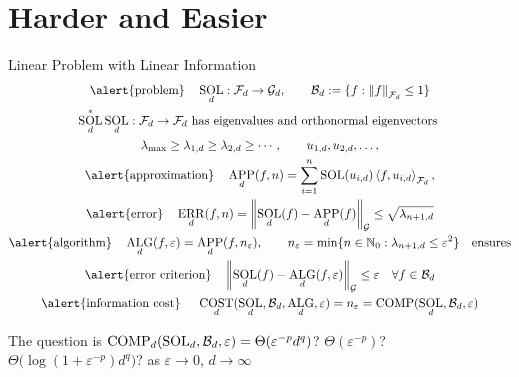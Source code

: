\documentclass[11pt,compress,xcolor={usenames,dvipsnames},aspectratio=169]{beamer}
\DeclareMathOperator{\COMP}{COMP}
\DeclareMathOperator{\COST}{COST}
\DeclareMathOperator{\ALG}{ALG}
\DeclareMathOperator{\SOL}{SOL}
\DeclareMathOperator{\APP}{APP}
\DeclareMathOperator{\ERR}{ERR}
\begin{document}
\section{Harder and Easier}
\begin{frame}{Linear Problem with Linear Information}
    \vspace{-6ex}
   \begin{gather*}
   \text{\alert{problem}}\quad \SOL_d : \cf_d \to \cg_d,  \qquad \cb_d : = \{f : \norm[\cf_d]{f} \le 1 \} \\
   \SOL_d^*\SOL_d : \cf_d \to \cf_d \text{ has eigenvalues and orthonormal eigenvectors } \\
\lambda_{\max} \ge \lambda_{1,d} \ge \lambda_{2,d} \ge \cdots, \qquad u_{1,d}, u_{2,d}, \ldots, \\
   \text{\alert{approximation}\quad} \APP_d(f,n) = \sum_{i=1}^n \SOL(u_{i,d}) \ip[\cf_d]{f}{u_{i,d}}, \\
   \text{\alert{error}\quad}\ERR_d(f,n) = \norm[\cg]{\SOL_d(f) - \APP_d(f)} \le \sqrt{\lambda_{n+1, d}} \\
   \text{\alert{algorithm}\quad} \ALG_d(f,\varepsilon) = \APP_d(f,n_\varepsilon), \qquad n_\varepsilon = \min \{n \in \natzero : \lambda_{n+1, d} \le \varepsilon^2\} \quad \text{ensures}\\
   \text{\alert{error criterion}\quad} \norm[\cg]{\SOL_d(f) - \ALG_d(f,\varepsilon)} \le \varepsilon \quad \forall f \in \cb_d \\
   \text{\alert{information cost} \quad} \COST_d(\SOL_d,\cb_d,\ALG_d,\varepsilon) = n_\varepsilon = \COMP(\SOL_d,\cb_d,\varepsilon)
   \end{gather*}
   
   \vspace{-3ex}
   The question is $\COMP_d(\SOL_d,\cb_d,\varepsilon) = \Theta(\varepsilon^{-p} d^q)$? $\Theta(\varepsilon^{-p})$? \\
   \qquad \qquad $\Theta\bigl(\log(1 + \varepsilon^{-p} ) d^q \bigr)$?
   \hfill \hfill as $\varepsilon \to 0$, $d \to \infty$
   

\end{frame}
\end{document}
